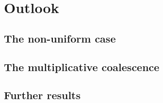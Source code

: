 
\chapter{Outlook}

\section{The non-uniform case}

\section{The multiplicative coalescence}

\section{Further results}